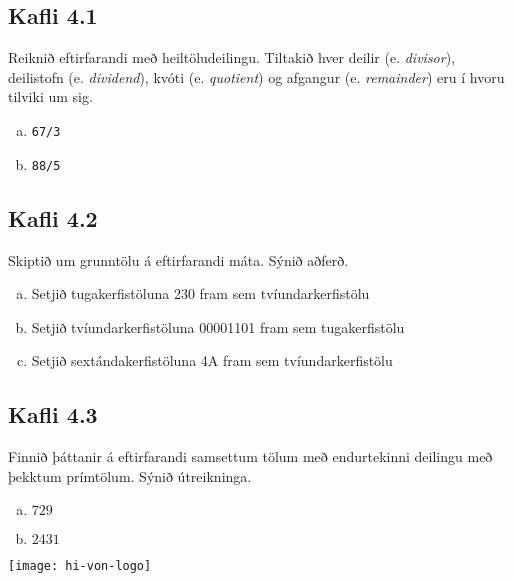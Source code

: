 \documentclass{exam}
\begin{document}
\begin{questions}
\subsection{Kafli 4.1}

\question Reiknið eftirfarandi með heiltöludeilingu. Tiltakið hver deilir (e. \emph{divisor}), deilistofn (e. \emph{dividend}), kvóti (e. \emph{quotient}) og afgangur (e. \emph{remainder}) eru í hvoru tilviki um sig.

\begin{enumerate}[a)]
 \item \texttt{67/3}
 \item \texttt{88/5}
\end{enumerate}

\subsection{Kafli 4.2}

\question Skiptið um grunntölu á eftirfarandi máta. Sýnið aðferð.

\begin{enumerate}[a)]
 \item Setjið tugakerfistöluna 230 fram sem tvíundarkerfistölu
 \item Setjið tvíundarkerfistöluna 00001101 fram sem tugakerfistölu
 \item Setjið sextándakerfistöluna 4A fram sem tvíundarkerfistölu
\end{enumerate}

\subsection{Kafli 4.3}

\question Finnið þáttanir á eftirfarandi samsettum tölum með endurtekinni deilingu með þekktum prímtölum. Sýnið útreikninga.

\begin{enumerate}[a)]
 \item $729$
 \item $2431$
\end{enumerate}

\end{questions}

\vfill
\texttt{[image: hi-von-logo]}
\end{document}
